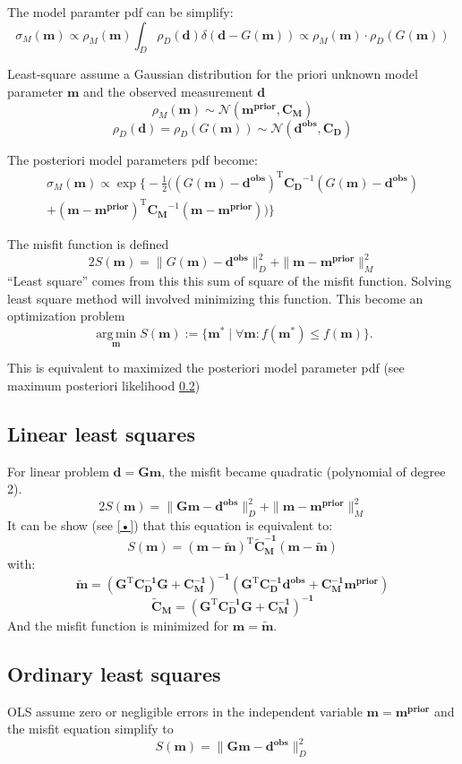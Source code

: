 \documentclass[twocolumn]{article}
\numberwithin{equation}{section}
\begin{document}
The model paramter pdf can be simplify:
$$\sigma_M(\mathbf{m}) \propto \rho_M(\mathbf{m})\int_D \rho_D(\mathbf{d}) \delta(\mathbf{d} - G(\mathbf{m}))\propto \rho_M(\mathbf{m}) \cdot \rho_D(G(\mathbf{m}))  $$

Least-square assume a Gaussian distribution for the priori unknown model parameter $\mathbf{m}$ and the observed measurement $\mathbf{d}$
$$\rho_M (\mathbf{m}) \sim \mathcal{N} (\mathbf{m^{prior}},\mathbf{C_M}) $$
$$\rho_D (\mathbf{d})=\rho_D (G(\mathbf{m})) \sim \mathcal{N} (\mathbf{d^{obs}},\mathbf{C_D})$$

The posteriori model parameters pdf become:
\begin{multline*}
\sigma_M(\mathbf{m})
	\propto \exp\Biggl\{  -\frac{1}{2} \biggl( (G(\mathbf{m})-\mathbf{d^{obs}})^\mathrm{T} \mathbf{C_D}^{-1} (G(\mathbf{m})-\mathbf{d^{obs}})\\
	+ (\mathbf{m}-\mathbf{m^{prior}})^\mathrm{T} \mathbf{C_M}^{-1} (\mathbf{m}-\mathbf{m^{prior}} )\biggr) \Biggr\}
\end{multline*}

The misfit function is defined
$$\boxed{2S(\mathbf{m})=\|G(\mathbf{m})-\mathbf{d^{obs}}\|_D^2 + \|\mathbf{m}-\mathbf{m^{prior}}\|_M^2}$$
``Least square'' comes from this this sum of square of the misfit function. Solving least square method will involved minimizing this function. This become an optimization problem
$$\operatorname*{arg\,min}_\mathbf{m}  S(\mathbf{m}) := \{\mathbf{m}^* \mid \forall \mathbf{m} : f(\mathbf{m}^*) \le f(\mathbf{m})\}.$$


This is equivalent to maximized the posteriori model parameter pdf (see maximum posteriori likelihood \ref{})

	\subsection{Linear least squares}
For linear problem $\mathbf{d=Gm}$, the misfit became quadratic (polynomial of degree 2). 
$$2S(\mathbf{m})=\|\mathbf{Gm}-\mathbf{d^{obs}}\|_D^2 + \|\mathbf{m}-\mathbf{m^{prior}}\|_M^2$$
It can be show (see \ref{•}) that this equation is equivalent to:
$$S(\mathbf{m})= (\mathbf{m-\tilde{m}})^\mathrm{T}  \mathbf{\tilde{C}_{M}^{-1}}  (\mathbf{m-\tilde{m}})$$
with:
$$\mathbf{\tilde{m}=(G^\mathrm{T}C_D^{-1}G+C_M^{-1})^{-1} (G^\mathrm{T}C_D^{-1}d^{obs}+C_M^{-1}m^{prior})}$$
$$\mathbf{\tilde{C}_M=(G^\mathrm{T}C_D^{-1}G+C_M^{-1})^{-1}}$$
And the misfit function is minimized for $\mathbf{m=\tilde{m}}$.


	\subsection{Ordinary least squares}
OLS assume zero or negligible errors in the independent variable $\mathbf{m=m^{prior}}$ and the misfit equation simplify to 
$$S(\mathbf{m})=\|\mathbf{Gm}-\mathbf{d^{obs}}\|_D^2$$
\end{document}
